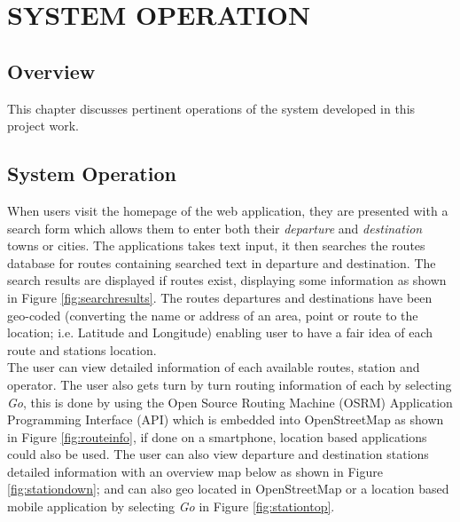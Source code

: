 
\chapter{SYSTEM OPERATION} %



\ifpdf
    \graphicspath{{4/figures/PNG/}{4/figures/PDF/}{4/figures/}}
\else
    \graphicspath{{4/figures/EPS/}{4/figures/}}
\fi

\section{Overview}
This chapter discusses pertinent operations of the system developed in this project work.

\section{System Operation}
When users visit the homepage of the web application, they are presented with a search form which allows them to enter both their \textit{departure} and \textit{destination} towns or cities. The applications takes text input, it then searches the routes database for routes containing searched text in departure and destination. The search results are displayed if routes exist,  displaying some information as shown in Figure \ref{fig:searchresults}. The routes departures and destinations have been geo-coded (converting the name or address of an area, point or route to the location; i.e. Latitude and Longitude) enabling user to have a fair idea of each route and stations location.\\

The user can view detailed information of each available routes, station and operator. The user also gets turn by turn routing information of each by selecting \textit{Go}, this is done by using the Open Source Routing Machine (OSRM) Application Programming Interface (API) which is embedded into OpenStreetMap as shown in Figure \ref{fig:routeinfo}, if done on a smartphone, location based applications could also be used. The user can also view departure and destination stations detailed information with an overview map below as shown in Figure \ref{fig:stationdown}; and can also geo located in OpenStreetMap or a location based mobile application by selecting \textit{Go} in Figure \ref{fig:stationtop}.


